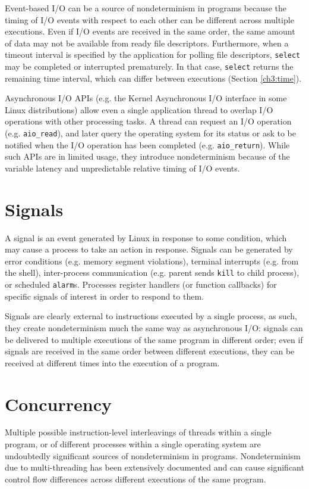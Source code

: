 Event-based I/O can be a source
of nondeterminism in programs because the
timing of I/O events with respect to each other
can be different across multiple executions.
Even if I/O events are received in the same order,
the same amount of data may not be available
from ready file descriptors. Furthermore, when a timeout
interval is specified by the application for polling file descriptors,
\texttt{select} may be completed or interrupted
prematurely. In that case, \texttt{select} returns
the remaining time interval, which can     
differ between executions (Section \ref{ch3:time}). \newline

 \newline
Asynchronous I/O APIs (e.g. the Kernel Asynchronous I/O interface
in some Linux distributions) allow even a single application
thread to overlap I/O operations with other processing
tasks. A thread can request an I/O operation (e.g. \texttt{aio\_read}),
and later query the operating system for its status or ask to be notified when the I/O operation
has been completed (e.g. \texttt{aio\_return}). While such APIs are in limited
usage, they introduce nondeterminism because of the
variable latency and unpredictable relative timing of I/O events.

\section{Signals}\label{ch3:sig}
A signal is an event generated by Linux
in response to some condition, which may cause
a process to take an action in response.
Signals can be generated by error conditions
(e.g. memory segment violations), 
terminal interrupts (e.g. from the shell), 
inter-process communication (e.g. parent 
sends \texttt{kill} to child process),
or scheduled \texttt{alarm}s. 
Processes register handlers (or function callbacks) for specific signals
of interest in order to respond to them.

Signals are clearly external to
instructions executed by a single process,
as such, they create nondeterminism 
much the same way as asynchronous I/O:
signals can be delivered to multiple executions
of the same program in different order; 
even if signals are received in the
same order between different executions,
they can be received at different times
into the execution of a program.

\section{Concurrency} \label{ch3:concurrency}
Multiple possible instruction-level interleavings of 
threads within a single program, 
or of different processes within 
a single operating system are
undoubtedly significant sources
of nondeterminism in programs.
Nondeterminism due to
multi-threading has been extensively
documented and can cause
significant control flow differences
across different executions of the same
program.

